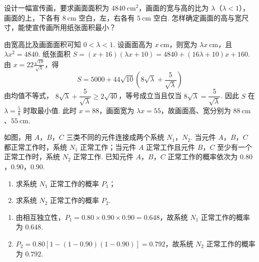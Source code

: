 \begin{problem}
设计一幅宣传画，要求画面面积为 \(4840\mathrm{~cm}^2\)，画面的宽与高的比为 \(\lambda\)（\(\lambda < 1\)），画面的上，下各有 \(8\mathrm{~cm}\) 空白，左，右各有 \(5\mathrm{~cm}\) 空白. 怎样确定画面的高与宽尺寸，能使宣传画所用纸张面积最小？

\begin{solution}
由宽高比及画面面积可知 \(0<\lambda<1\). 设画面高为 \(x\mathrm{~cm}\)，则宽为 \(\lambda x\mathrm{~cm}\)，且 \(\lambda x^2=4840\). 纸张面积 \(S=(x+16)(\lambda x+10)=4840+(16\lambda+10)x+160\).
由 \(x=22\frac{\sqrt{10}}{\sqrt{\lambda}}\)，得
\[
S=5000+44\sqrt{10}\left(8\sqrt{\lambda}+\frac5{\sqrt{\lambda}}\right)
\]
由均值不等式，
\(8\sqrt{\lambda}+\dfrac5{\sqrt{\lambda}}\geq2\sqrt{40}\)，等号成立当且仅当
\(8\sqrt{\lambda}=\dfrac5{\sqrt{\lambda}}\). 因此 \(S\) 在 \(\lambda=\frac{5}{8}\) 时取最小值. 此时 \(x=88\)，画面宽为 \(\lambda x=55\)，故画面高、宽分别为 \(88\mathrm{~cm}\)、\(55\mathrm{~cm}\).
\end{solution}
\end{problem}

\begin{problem}
如图，用 \(A\)，\(B\)，\(C\) 三类不同的元件连接成两个系统 \(N_1\)，\(N_2\). 当元件 \(A\)，\(B\)，\(C\) 都正常工作时，系统 \(N_1\) 正常工作；当元件 \(A\) 正常工作且元件 \(B\)，\(C\) 至少有一个正常工作时，系统 \(N_2\) 正常工作. 已知元件 \(A\)，\(B\)，\(C\) 正常工作的概率依次为 \(0.80\)，\(0.90\)，\(0.90\).

\begin{enumerate}
\item 求系统 \(N_1\) 正常工作的概率 \(P_1\)；
\item 求系统 \(N_2\) 正常工作的概率 \(P_2\).
\end{enumerate}

\end{problem}

\begin{solution}
\begin{enumerate}
\item 由相互独立性，\(P_1=0.80\times0.90\times0.90=0.648\)，故系统 \(N_1\) 正常工作的概率为 \(0.648\).

\item \(P_2=0.80\left[1-(1-0.90)(1-0.90)\right]=0.792\)，故系统 \(N_2\) 正常工作的概率为 \(0.792\).
\end{enumerate}
\end{solution}

